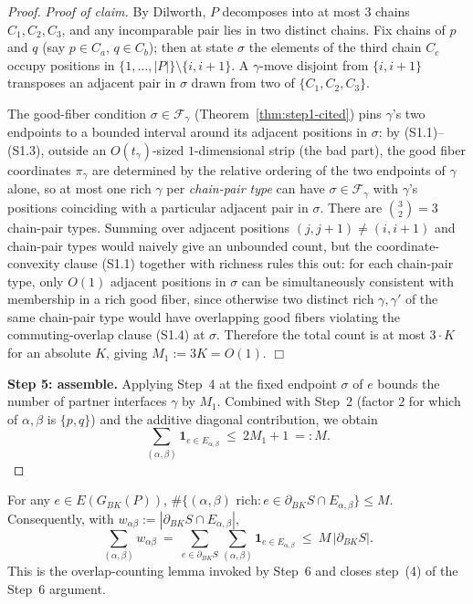 \begin{proof}
\emph{Proof of claim.} By Dilworth, $P$ decomposes into at most $3$
chains $C_1,C_2,C_3$, and any incomparable pair lies in two distinct
chains. Fix chains of $p$ and $q$ (say $p\in C_a$, $q\in C_b$); then at
state $\sigma$ the elements of the third chain $C_c$ occupy positions in
$\{1,\ldots,|P|\}\setminus\{i,i+1\}$. A $\gamma$-move disjoint from
$\{i,i+1\}$ transposes an adjacent pair in $\sigma$ drawn from two of
$\{C_1,C_2,C_3\}$.

The good-fiber condition $\sigma\in\mathcal F_\gamma$ (Theorem~\ref{thm:step1-cited})
pins $\gamma$'s two endpoints to a bounded interval around its adjacent
positions in $\sigma$: by (S1.1)--(S1.3), outside an $O(t_{\gamma})$-sized
$1$-dimensional strip (the bad part), the good fiber coordinates
$\pi_\gamma$ are determined by the relative ordering of the two endpoints
of $\gamma$ alone, so at most one rich $\gamma$ per \emph{chain-pair type}
can have $\sigma\in\mathcal F_\gamma$ with $\gamma$'s positions coinciding
with a particular adjacent pair in $\sigma$. There are $\binom{3}{2}=3$
chain-pair types. Summing over adjacent positions $(j,j+1)\ne(i,i+1)$ and
chain-pair types would naively give an unbounded count, but the
coordinate-convexity clause (S1.1) together with richness rules this out:
for each chain-pair type, only $O(1)$ adjacent positions in $\sigma$ can
be simultaneously consistent with membership in a rich good fiber, since
otherwise two distinct rich $\gamma,\gamma'$ of the same chain-pair type
would have overlapping good fibers violating the commuting-overlap
clause (S1.4) at $\sigma$. Therefore the total count is at most $3\cdot
K$ for an absolute $K$, giving $M_1:=3K=O(1)$. \hfill$\Box$

\smallskip\noindent\textbf{Step 5: assemble.}
Applying Step~4 at the fixed endpoint $\sigma$ of $e$ bounds the number
of partner interfaces $\gamma$ by $M_1$. Combined with Step~2 (factor
$2$ for which of $\alpha,\beta$ is $\{p,q\}$) and the additive diagonal
contribution, we obtain
\[
\sum_{(\alpha,\beta)}\mathbf{1}_{e\in E_{\alpha,\beta}}
\ \le\ 2M_1+1\ =:M.
\]
\end{proof}

\begin{corollary}\label{cor:step6-input}
For any $e\in E(G_{BK}(P))$,
$\#\{(\alpha,\beta)\text{ rich}:e\in\partial_{BK}S\cap E_{\alpha,\beta}\}\le M$.
Consequently, with $w_{\alpha\beta}:=|\partial_{BK}S\cap E_{\alpha,\beta}|$,
\[
\sum_{(\alpha,\beta)}w_{\alpha\beta}
\ =\ \sum_{e\in\partial_{BK}S}\sum_{(\alpha,\beta)}\mathbf{1}_{e\in E_{\alpha,\beta}}
\ \le\ M\,|\partial_{BK}S|.
\]
This is the overlap-counting lemma invoked by Step~6 and
closes step~(4) of the Step~6 argument.
\end{corollary}

